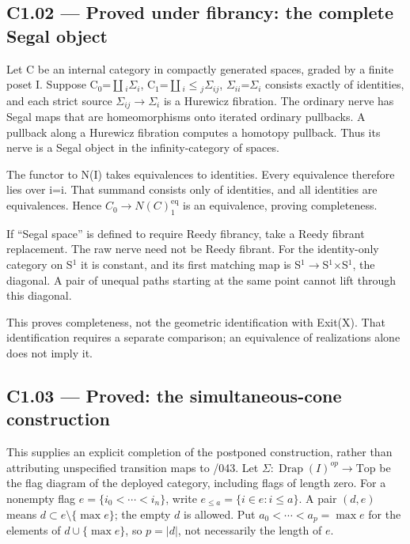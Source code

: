 \subsection{C1.02 --- Proved under fibrancy: the complete Segal object}\label{c1.02-proved-under-fibrancy-the-complete-segal-object}

Let C be an internal category in compactly generated spaces, graded by a finite poset I. Suppose C\ensuremath{{}_{0}}=\ensuremath{\coprod}\ensuremath{{}_{i}}\ensuremath{\Sigma}\ensuremath{{}_{i}}, C\ensuremath{{}_{1}}=\ensuremath{\coprod}\ensuremath{{}_{i}}\ensuremath{\le}\ensuremath{{}_{j}}\ensuremath{\Sigma}\ensuremath{{}_{ij}}, \ensuremath{\Sigma}\ensuremath{{}_{ii}}=\ensuremath{\Sigma}\ensuremath{{}_{i}} consists exactly of identities, and each strict source \ensuremath{\Sigma}\ensuremath{{}_{ij}}\ensuremath{\to}\ensuremath{\Sigma}\ensuremath{{}_{i}} is a Hurewicz fibration. The ordinary nerve has Segal maps that are homeomorphisms onto iterated ordinary pullbacks. A pullback along a Hurewicz fibration computes a homotopy pullback. Thus its nerve is a Segal object in the infinity-category of spaces.

The functor to N(I) takes equivalences to identities. Every equivalence therefore lies over i=i. That summand consists only of identities, and all identities are equivalences. Hence \(C_0\to N(C)_1^{\mathrm{eq}}\) is an equivalence, proving completeness.

If ``Segal space'' is defined to require Reedy fibrancy, take a Reedy fibrant replacement. The raw nerve need not be Reedy fibrant. For the identity-only category on S\ensuremath{{}^{1}} it is constant, and its first matching map is S\ensuremath{{}^{1}}\ensuremath{\to}S\ensuremath{{}^{1}}\ensuremath{\times}S\ensuremath{{}^{1}}, the diagonal. A pair of unequal paths starting at the same point cannot lift through this diagonal.

This proves completeness, not the geometric identification with Exit(X). That identification requires a separate comparison; an equivalence of realizations alone does not imply it.

\subsection{C1.03 --- Proved: the simultaneous-cone construction}\label{c1.03-proved-the-simultaneous-cone-construction}

This supplies an explicit completion of the postponed construction, rather than attributing unspecified transition maps to /043. Let \(\Sigma:\operatorname{Drap}(I)^{op}\to\mathrm{Top}\) be the flag diagram of the deployed category, including flags of length zero. For a nonempty flag \(e=\{i_0<\cdots<i_n\}\), write \(e_{\le a}=\{i\in e:i\le a\}\). A pair \((d,e)\) means \(d\subset e\setminus\{\max e\}\); the empty \(d\) is allowed. Put \(a_0<\cdots<a_p=\max e\) for the elements of \(d\cup\{\max e\}\), so \(p=|d|\), not necessarily the length of \(e\).

